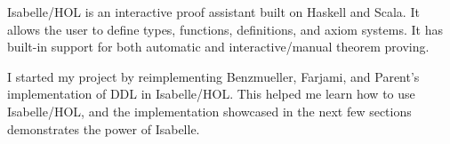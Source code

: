 %
\begin{isabellebody}%
%
%
\isadelimtheory
%
\endisadelimtheory
%
\isatagtheory
%
\endisatagtheory
{\isafoldtheory}%
%
\isadelimtheory
%
\endisadelimtheory
%
\isadelimdocument
%
\endisadelimdocument
%
\isatagdocument
%
\isamarkuptrue%
%
\endisatagdocument
{\isafolddocument}%
%
\isadelimdocument
%
\endisadelimdocument
%
\begin{isamarkuptext}%
Isabelle/HOL is an interactive proof assistant \cite{isabelle} built on Haskell and Scala. It 
allows the user to define types, functions, definitions, and axiom systems. It has built-in support for both
automatic and interactive/manual theorem proving. 

I started my project by reimplementing Benzmueller, Farjami, and Parent's \cite{BFP} \cite{logikey} implementation 
of DDL in Isabelle/HOL. This helped me learn how to use Isabelle/HOL, and the implementation showcased in the 
next few sections demonstrates the power of Isabelle.


\end{isamarkuptext}
\end{isabellebody}
